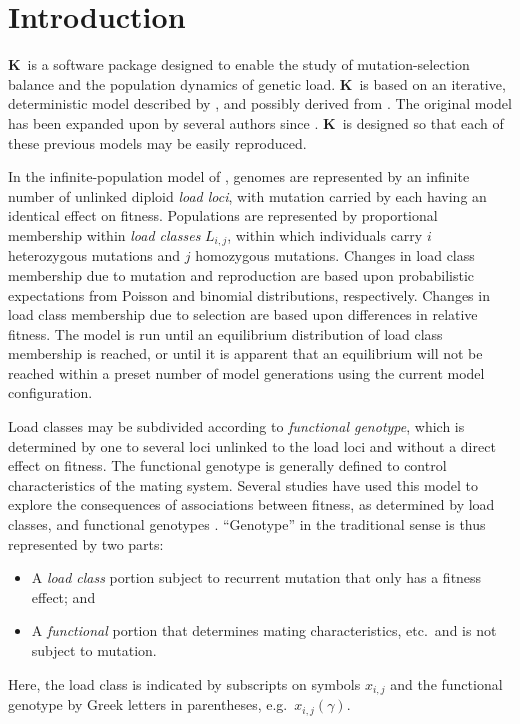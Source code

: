 \documentclass[10pt,twoside,a4paper,fleqn]{report}
\numberwithin{equation}{section}  %
\newcommand{\K}{{\bf K}}
\newcommand{\xijg}{\mbox{$x_{i,j}(\gamma)$}}
\newcommand{\Lij}{\mbox{$L_{i,j}$}}              %
\begin{document}
\clearpage

\tableofcontents
\newpage
\listoftables
\listoffigures
\clearpage
\chapter{Introduction}

\K\ is a software package designed to enable the study of mutation-selection
balance and the population dynamics of genetic load.  \K\ is based on an
iterative, deterministic model described by \citet{Kondrashov:1985:5375}, and
possibly derived from \citet{Heller:1979:10277}.  The original model has been
expanded upon by several authors since \citep[e.g.,][and
others]{Charlesworth:1990:5337, Lande:1994:5345, Muirhead:1997:5426,
Morgan:2001:5443}.  \K\ is designed so that each of these previous models may
be easily reproduced.

In the infinite-population model of \citet{Kondrashov:1985:5375}, genomes are
represented by an infinite number of unlinked diploid {\em load loci}, with
mutation carried by each having an identical effect on fitness.  Populations
are represented by proportional membership within {\em load classes} \Lij,
within which individuals carry $i$ heterozygous mutations and $j$ homozygous
mutations.  Changes in load class membership due to mutation and reproduction
are based upon probabilistic expectations from Poisson and binomial
distributions, respectively.  Changes in load class membership due to selection
are based upon differences in relative fitness.  The model is run until an
equilibrium distribution of load class membership is reached, or until it is
apparent that an equilibrium will not be reached within a preset number of
model generations using the current model configuration.

Load classes may be subdivided according to {\em functional genotype}, which is
determined by one to several loci unlinked to the load loci and without a
direct effect on fitness.  The functional genotype is generally defined to
control characteristics of the mating system.  Several studies have used this
model to explore the consequences of associations between fitness, as
determined by load classes, and functional genotypes \citep[and
others]{Kondrashov:1985:5375, Charlesworth:1990:5337}.  ``Genotype'' in the
traditional sense is thus represented by two parts:
\begin{itemize}
	\item A {\em load class} portion subject to recurrent mutation that only has a fitness effect; and
	\item A {\em functional} portion that determines mating characteristics, etc.\ and is not subject to mutation.
\end{itemize}
Here, the load class is indicated by subscripts on symbols $x_{i,j}$ and the
functional genotype by Greek letters in parentheses, e.g.\ \xijg.
\end{document}
